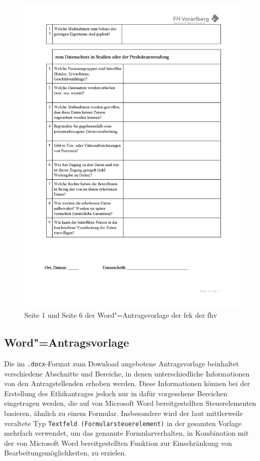 \documentclass[a4paper,12pt,twoside]{scrreprt}
\begin{document}
\begin{figure}[ht]
\begin{minipage}[b]{.49\linewidth}
        \includegraphics[width=\linewidth]{thesis/images/Luidold_Word-Vorlage-FHV-2.png}
    \end{minipage}
    \caption[{Seite 1 und Seite 6 der Word"=Antragsvorlage der \acl{fek} der \acl{fhv}}]{Seite 1 und Seite 6 der Word"=Antragsvorlage der \acs{fek} der \acs{fhv} \cite{fachhochschule_vorarlberg_gmbh_forschungsethik-kommission_2021}}
    \label{fig:dokumentenvorlage-fek}
\end{figure}

\subsection{Word"=Antragsvorlage}
\label{sub-sec:technischer-aufbau-word-antragsvorlage}

Die im \texttt{.docx}-Format zum Download angebotene Antragsvorlage beinhaltet verschiedene Abschnitte und Bereiche, in denen unterschiedliche Informationen von den Antragstellenden erhoben werden. Diese Informationen können bei der Erstellung des Ethikantrages jedoch nur in dafür vorgesehene Bereichen eingetragen werden, die auf von Microsoft Word bereitgestellten Steuerelementen basieren, ähnlich zu einem Formular. Insbesondere wird der laut \cite{ay_textfelder_2023} mittlerweile veraltete Typ \texttt{Textfeld (Formularsteuerelement)} in der gesamten Vorlage mehrfach verwendet, um das genannte Formularverhalten, in Kombination mit der von Microsoft Word bereitgestellten Funktion zur Einschränkung von Bearbeitungsmöglichkeiten, zu erzielen.
\end{document}

